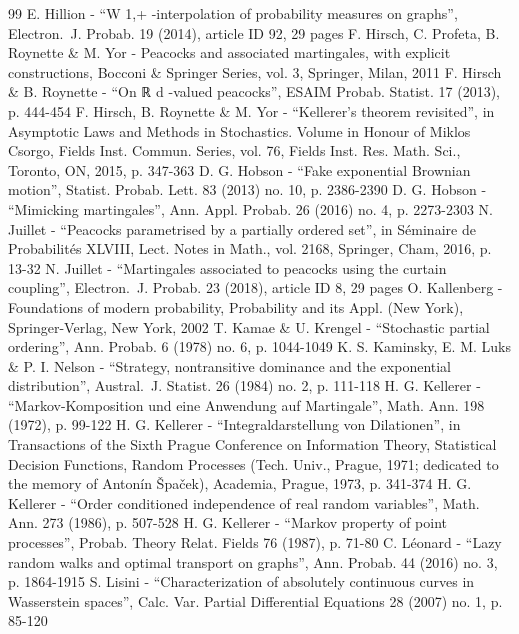 \begin{thebibliography}{99}
 E. Hillion - “W 1,+ -interpolation of probability measures on graphs”, Electron. J. Probab. 19 (2014), article ID 92, 29 pages
 F. Hirsch, C. Profeta, B. Roynette \& M. Yor - Peacocks and associated martingales, with explicit constructions, Bocconi \& Springer Series, vol. 3, Springer, Milan, 2011
 F. Hirsch \& B. Roynette - “On ℝ d -valued peacocks”, ESAIM Probab. Statist. 17 (2013), p. 444-454
 F. Hirsch, B. Roynette \& M. Yor - “Kellerer’s theorem revisited”, in Asymptotic Laws and Methods in Stochastics. Volume in Honour of Miklos Csorgo, Fields Inst. Commun. Series, vol. 76, Fields Inst. Res. Math. Sci., Toronto, ON, 2015, p. 347-363
 D. G. Hobson - “Fake exponential Brownian motion”, Statist. Probab. Lett. 83 (2013) no. 10, p. 2386-2390
 D. G. Hobson - “Mimicking martingales”, Ann. Appl. Probab. 26 (2016) no. 4, p. 2273-2303
 N. Juillet - “Peacocks parametrised by a partially ordered set”, in Séminaire de Probabilités XLVIII, Lect. Notes in Math., vol. 2168, Springer, Cham, 2016, p. 13-32
 N. Juillet - “Martingales associated to peacocks using the curtain coupling”, Electron. J. Probab. 23 (2018), article ID 8, 29 pages
 O. Kallenberg - Foundations of modern probability, Probability and its Appl. (New York), Springer-Verlag, New York, 2002
 T. Kamae \& U. Krengel - “Stochastic partial ordering”, Ann. Probab. 6 (1978) no. 6, p. 1044-1049
 K. S. Kaminsky, E. M. Luks \& P. I. Nelson - “Strategy, nontransitive dominance and the exponential distribution”, Austral. J. Statist. 26 (1984) no. 2, p. 111-118
 H. G. Kellerer - “Markov-Komposition und eine Anwendung auf Martingale”, Math. Ann. 198 (1972), p. 99-122
 H. G. Kellerer - “Integraldarstellung von Dilationen”, in Transactions of the Sixth Prague Conference on Information Theory, Statistical Decision Functions, Random Processes (Tech. Univ., Prague, 1971; dedicated to the memory of Antonín Špaček), Academia, Prague, 1973, p. 341-374
 H. G. Kellerer - “Order conditioned independence of real random variables”, Math. Ann. 273 (1986), p. 507-528
 H. G. Kellerer - “Markov property of point processes”, Probab. Theory Relat. Fields 76 (1987), p. 71-80
 C. Léonard - “Lazy random walks and optimal transport on graphs”, Ann. Probab. 44 (2016) no. 3, p. 1864-1915
 S. Lisini - “Characterization of absolutely continuous curves in Wasserstein spaces”, Calc. Var. Partial Differential Equations 28 (2007) no. 1, p. 85-120

\end{thebibliography}
